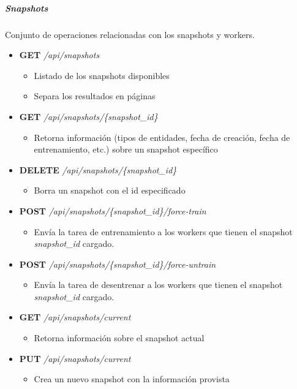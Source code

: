 \documentclass[12pt,a4paper,]{scrartcl}
\providecommand{\tightlist}{%
  \setlength{\itemsep}{0pt}\setlength{\parskip}{0pt}}
\let\oldsubparagraph\subparagraph
\renewcommand{\subparagraph}[1]{\oldsubparagraph{#1}\mbox{}}
\begin{document}
\hypertarget{snapshots-1}{%
\subparagraph{Snapshots}\label{snapshots-1}}

Conjunto de operaciones relacionadas con los snapshots y workers.

\begin{itemize}
\tightlist
\item
  \textbf{GET} \emph{/api/snapshots}

  \begin{itemize}
  \tightlist
  \item
    Listado de los snapshots disponibles
  \item
    Separa los resultados en páginas
  \end{itemize}
\item
  \textbf{GET} \emph{/api/snapshots/\{snapshot\_id\}}

  \begin{itemize}
  \tightlist
  \item
    Retorna información (tipos de entidades, fecha de creación, fecha de entrenamiento, etc.) sobre un snapshot específico
  \end{itemize}
\item
  \textbf{DELETE} \emph{/api/snapshots/\{snapshot\_id\}}

  \begin{itemize}
  \tightlist
  \item
    Borra un snapshot con el id especificado
  \end{itemize}
\item
  \textbf{POST} \emph{/api/snapshots/\{snapshot\_id\}/force-train}

  \begin{itemize}
  \tightlist
  \item
    Envía la tarea de entrenamiento a los workers que tienen el snapshot \emph{snapshot\_id} cargado.
  \end{itemize}
\item
  \textbf{POST} \emph{/api/snapshots/\{snapshot\_id\}/force-untrain}

  \begin{itemize}
  \tightlist
  \item
    Envía la tarea de desentrenar a los workers que tienen el snapshot \emph{snapshot\_id} cargado.
  \end{itemize}
\item
  \textbf{GET} \emph{/api/snapshots/current}

  \begin{itemize}
  \tightlist
  \item
    Retorna información sobre el snapshot actual
  \end{itemize}
\item
  \textbf{PUT} \emph{/api/snapshots/current}

  \begin{itemize}
  \tightlist
  \item
    Crea un nuevo snapshot con la información provista
  \end{itemize}
\end{itemize}
\end{document}
